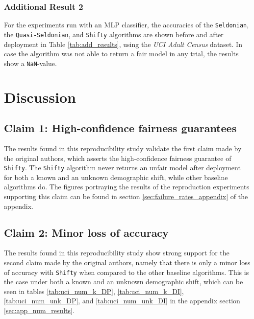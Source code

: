 \subsubsection{Additional Result 2}
For the experiments run with an MLP classifier, the accuracies of the \texttt{Seldonian}, the \texttt{Quasi-Seldonian}, and \texttt{Shifty} algorithms are shown before and after deployment in Table \ref{tab:add_results}, using the \textit{UCI Adult Census} dataset. In case the algorithm was not able to return a fair model in any trial, the results show a \texttt{NaN}-value.





\section{Discussion}

\subsection{Claim 1: High-confidence fairness guarantees} \label{sec:discussion_fail}
The results found in this reproducibility study validate the first claim made by the original authors, which asserts the high-confidence fairness guarantee of \texttt{Shifty}. The \texttt{Shifty} algorithm never returns an unfair model after deployment for both a known and an unknown demographic shift, while other baseline algorithms do. The figures portraying the results of the reproduction experiments supporting this claim can be found in section \ref{sec:failure_rates_appendix} of the appendix.


\subsection{Claim 2: Minor loss of accuracy} \label{sec:discussion_accuracy}
The results found in this reproducibility study show strong support for the second claim made by the original authors, namely that there is only a minor loss of accuracy with \texttt{Shifty} when compared to the other baseline algorithms. This is the case under both a known and an unknown demographic shift, which can be seen in tables \ref{tab:uci_num_k_DP}, \ref{tab:uci_num_k_DI}, \ref{tab:uci_num_unk_DP}, and \ref{tab:uci_num_unk_DI} in the appendix section \ref{sec:app_num_results}. 

